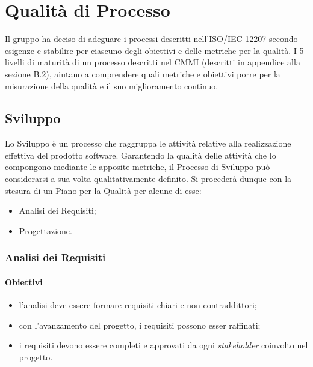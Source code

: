 \section{Qualità di Processo}
Il gruppo ha deciso di adeguare i processi descritti nell'ISO/IEC 12207 secondo esigenze e stabilire per ciascuno degli obiettivi e delle metriche per la qualità. I 5 livelli di maturità di un processo descritti nel CMMI (descritti in appendice alla sezione \textsection B.2), aiutano a comprendere quali metriche e obiettivi porre per la misurazione della qualità e il suo miglioramento continuo.
\subsection{Sviluppo}
Lo Sviluppo è un processo che raggruppa le attività relative alla realizzazione effettiva del prodotto software. Garantendo la qualità delle attività che lo compongono mediante le apposite metriche, il Processo di Sviluppo può considerarsi a sua volta qualitativamente definito. Si procederà dunque con la stesura di un Piano per la Qualità per alcune di esse:
\begin{itemize}
	\item Analisi dei Requisiti;
	\item Progettazione.
\end{itemize}
\subsubsection{Analisi dei Requisiti}
\paragraph{Obiettivi}
\begin{itemize}
	\item l'analisi deve essere formare requisiti chiari e non contraddittori;
	\item con l'avanzamento del progetto, i requisiti possono esser raffinati;
	\item i requisiti devono essere completi e approvati da ogni \textit{stakeholder\glos} coinvolto nel progetto.
\end{itemize}
